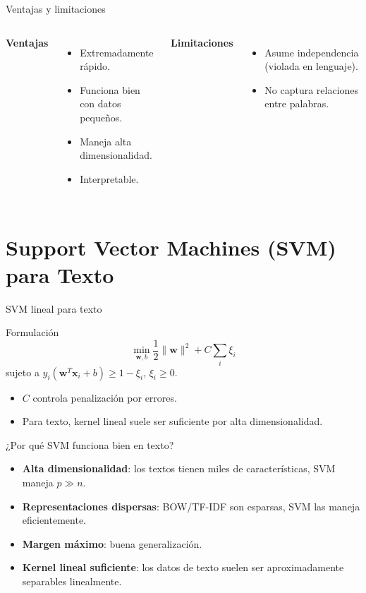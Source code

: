 \documentclass[aspectratio=169, 10pt, xcolor=table]{beamer}
\begin{document}
\begin{frame}{Ventajas y limitaciones}
    \begin{columns}[t]
        \textbf{Ventajas}
        \begin{itemize}
            \item Extremadamente rápido.
            \item Funciona bien con datos pequeños.
            \item Maneja alta dimensionalidad.
            \item Interpretable.
        \end{itemize}
        \textbf{Limitaciones}
        \begin{itemize}
            \item Asume independencia (violada en lenguaje).
            \item No captura relaciones entre palabras.
        \end{itemize}
    \end{columns}
\end{frame}

\section{Support Vector Machines (SVM) para Texto}

\begin{frame}{SVM lineal para texto}
    \begin{block}{Formulación}
        \[
        \min_{\mathbf{w},b} \frac{1}{2}\|\mathbf{w}\|^2 + C\sum_i \xi_i
        \]
        sujeto a $y_i(\mathbf{w}^T\mathbf{x}_i + b) \ge 1 - \xi_i$, $\xi_i \ge 0$.
    \end{block}
    \begin{itemize}
        \item $C$ controla penalización por errores.
        \item Para texto, kernel lineal suele ser suficiente por alta dimensionalidad.
    \end{itemize}
\end{frame}

\begin{frame}{¿Por qué SVM funciona bien en texto?}
    \begin{itemize}
        \item \textbf{Alta dimensionalidad}: los textos tienen miles de características, SVM maneja $p \gg n$.
        \item \textbf{Representaciones dispersas}: BOW/TF-IDF son esparsas, SVM las maneja eficientemente.
        \item \textbf{Margen máximo}: buena generalización.
        \item \textbf{Kernel lineal suficiente}: los datos de texto suelen ser aproximadamente separables linealmente.
    \end{itemize}
\end{frame}
\end{document}
